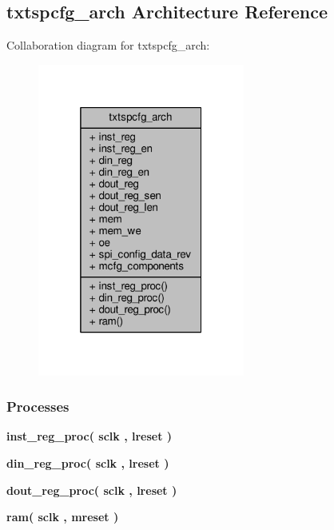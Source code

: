 \subsection{txtspcfg\+\_\+arch Architecture Reference}
\label{classtxtspcfg_1_1txtspcfg__arch}


Collaboration diagram for txtspcfg\+\_\+arch\+:\nopagebreak
\begin{figure}[H]
\begin{center}
\leavevmode
\includegraphics[width=193pt]{d7/de2/classtxtspcfg_1_1txtspcfg__arch__coll__graph}
\end{center}
\end{figure}
\subsubsection*{Processes}
 \begin{DoxyCompactItemize}
\item 
{\bf inst\+\_\+reg\+\_\+proc}{\bfseries  ( {\bfseries {\bfseries {\bf sclk}} \textcolor{vhdlchar}{ }} , {\bfseries {\bfseries {\bf lreset}} \textcolor{vhdlchar}{ }} )}
\item 
{\bf din\+\_\+reg\+\_\+proc}{\bfseries  ( {\bfseries {\bfseries {\bf sclk}} \textcolor{vhdlchar}{ }} , {\bfseries {\bfseries {\bf lreset}} \textcolor{vhdlchar}{ }} )}
\item 
{\bf dout\+\_\+reg\+\_\+proc}{\bfseries  ( {\bfseries {\bfseries {\bf sclk}} \textcolor{vhdlchar}{ }} , {\bfseries {\bfseries {\bf lreset}} \textcolor{vhdlchar}{ }} )}
\item 
{\bf ram}{\bfseries  ( {\bfseries {\bfseries {\bf sclk}} \textcolor{vhdlchar}{ }} , {\bfseries {\bfseries {\bf mreset}} \textcolor{vhdlchar}{ }} )}
\end{DoxyCompactItemize}
